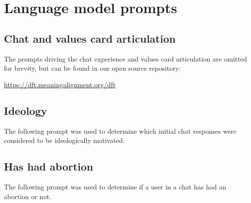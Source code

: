 \documentclass{article}
\theoremstyle{definition}
\begin{document}
\section{Language model prompts}\label{sec:a_prompts}

\subsection{Chat and values card articulation}

The prompts driving the chat experience and values card articulation are omitted for brevity, but can be found in our open source repository:

\href{https://dft.meaningalignment.org/dft}{https://dft.meaningalignment.org/dft}

\subsection{Ideology}\label{sec:a_prompts_ideology}
The following prompt was used to determine which initial chat responses were considered to be ideologically motivated.


\setlength{\fboxsep}{10pt} %
\noindent
{}

\subsection{Has had abortion}\label{sec:a_prompts_abortion}
The following prompt was used to determine if a user in a chat has had an abortion or not.


\setlength{\fboxsep}{10pt} %
\noindent
{}
\end{document}
